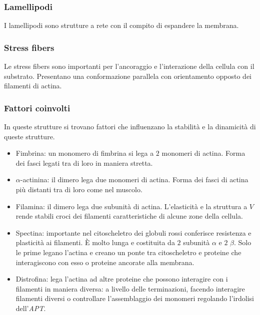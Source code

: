 		\subsubsection{Lamellipodi}
		I lamellipodi sono strutture a rete con il compito di espandere la membrana.

		\subsubsection{Stress fibers}
		Le stress fibers sono importanti per l'ancoraggio e l'interazione della cellula con il substrato.
		Presentano una conformazione parallela con orientamento opposto dei filamenti di actina.

		\subsubsection{Fattori coinvolti}
		In queste strutture si trovano fattori che influenzano la stabilit\`a e la dinamicit\`a di queste strutture.
		\begin{multicols}{2}
			\begin{itemize}
				\item Fimbrina: un monomero di fimbrina si lega a $2$ monomeri di actina.
					Forma dei fasci legati tra di loro in maniera stretta.
				\item $\alpha$-actinina: il dimero lega due monomeri di actina.
					Forma dei fasci di actina pi\`u distanti tra di loro come nel muscolo.
				\item Filamina: il dimero lega due subunit\`a di actina.
					L'elasticit\`a e la struttura a $V$ rende stabili croci dei filamenti caratteristiche di alcune zone della cellula.
				\item Spectina: importante nel citoscheletro dei globuli rossi conferisce resistenza e plasticit\`a ai filamenti.
					\`E molto lunga e costituita da $2$ subunit\`a $\alpha$ e $2$ $\beta$.
					Solo le prime legano l'actina e creano un ponte tra citoscheletro e proteine che interagiscono con esso o proteine ancorate alla membrana.
				\item Distrofina: lega l'actina ad altre proteine che possono interagire con i filamenti in maniera diversa: a livello delle terminazioni, facendo interagire filamenti diversi o controllare l'assemblaggio dei monomeri regolando l'irdolisi dell'\emph{APT}.
			\end{itemize}
		\end{multicols}

